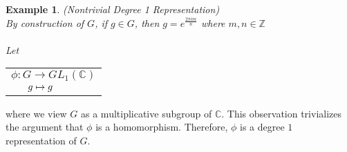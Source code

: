 \documentclass[10pt]{ucthesis}
\newtheorem{example}[definition]{Example}
\begin{document}
	

\begin{example}
	(Nontrivial Degree 1 Representation) \\
	By construction of $G$, if $g\in G$, then $g = e^{\frac{2\pi im }{n}}$ where $m,n\in \mathbb{Z}$	
	\renewcommand{\arraystretch}{0.7}\\\\
	Let   \begin{tabular}{l}$\phi:G\rightarrow GL_1(\mathbb{C})$\\
		$\hspace{6mm}g\mapsto g$
		\end{tabular}
\end{example}
\noindent where we view $G$ as a multiplicative subgroup of $\mathbb{C}$. This observation trivializes the argument that $\phi$ is a homomorphism. Therefore, $\phi$ is a degree $1$ representation of $G$.		
\end{document}
